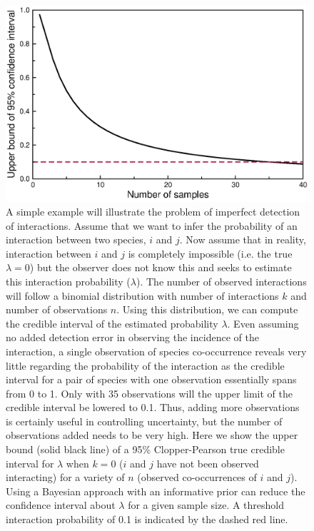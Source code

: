\documentclass[12pt]{article}
\begin{document}
  \begin{figure}[h!]
    \caption{A simple example will illustrate the problem of imperfect detection of interactions. Assume that we want to infer the probability of an interaction between two species, $i$ and $j$. Now assume that in reality, interaction between $i$ and $j$ is completely impossible (i.e. the true $\lambda=0$) but the observer does not know this and seeks to estimate this interaction probability ($\lambda$). The number of observed interactions will follow a binomial distribution with number of interactions $k$ and number of observations $n$. Using this distribution, we can compute the credible interval of the estimated probability $\lambda$. Even assuming no added detection error in observing the incidence of the interaction, a single observation of species co-occurrence reveals very little regarding the probability of the interaction as the credible interval for a pair of species with one observation essentially spans from 0 to 1. Only with 35 observations will the upper limit of the credible interval be lowered to 0.1. Thus, adding more observations is certainly useful in controlling uncertainty, but the number of observations added needs to be very high. Here we show the upper bound (solid black line) of a 95\% Clopper-Pearson true credible interval for $\lambda$ when $k=0$ ($i$ and $j$ have not been observed interacting) for a variety of $n$ (observed co-occurrences of $i$ and $j$). Using a Bayesian approach with an informative prior can reduce the confidence interval about $\lambda$ for a given sample size. A threshold interaction probability of 0.1 is indicated by the dashed red line. }
    \label{upper_limits}
    \begin{center}
    \includegraphics*[width=.8\textwidth]{figures/upper_limit_DG.eps}
    \end{center}
    \end{figure}
\end{document}
